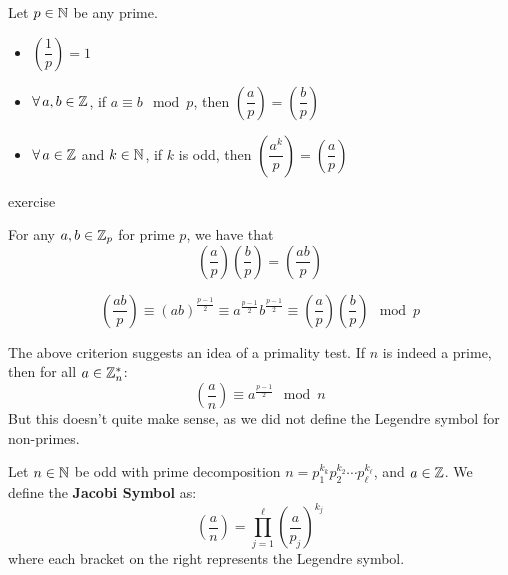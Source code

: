 \documentclass{article}
\begin{document}
\begin{thm}
    Let $ p \in \mathbb{N} $ be any prime.
    \begin{itemize}
        \item $ \left( \dfrac{1}{p} \right) = 1 $
        \item $ \forall \,  a, b \in \mathbb{Z} $, if $ a \equiv b \mod p $, then
            $ \left( \dfrac{a}{p} \right) = \left( \dfrac{b}{p} \right) $
        \item $ \forall \, a \in \mathbb{Z} $ and $ k \in \mathbb{N} $,
            if $ k $ is odd, then $ \left( \dfrac{a^{k}}{p} \right) = \left( \dfrac{a}{p} \right) $
    \end{itemize}
\end{thm}

\begin{pf}
    exercise
\end{pf}

\begin{thm}
    For any $ a, b \in \mathbb{Z}_{p} $ for prime $ p $, we have that
    \begin{equation*}
        \left( \frac{a}{p} \right) \left( \frac{b}{p} \right) = \left( \frac{ab}{p} \right)
    \end{equation*}
\end{thm}

\begin{pf}[source=Primary Source Material]
    \begin{equation*}
        \left( \frac{ab}{p} \right) \equiv (ab)^{\frac{p - 1}{2}}
        \equiv a^{\frac{p - 1}{2}} b^{\frac{p - 1}{2}}
        \equiv \left( \frac{a}{p} \right) \left( \frac{b}{p} \right) \mod p
    \end{equation*}
\end{pf}

The above criterion suggests an idea of a primality test.
If $ n $ is indeed a prime, then for all $ a \in \mathbb{Z}_{n}^{*} $:
\begin{equation*}
    \left( \frac{a}{n} \right) \equiv a^{\frac{p - 1}{2}} \mod n
\end{equation*}
But this doesn't quite make sense, as we did not define the Legendre symbol for non-primes.

\newpage
{}

\begin{defn}[title=Jacobi Symbol]
    Let $ n \in \mathbb{N} $ be odd with prime decomposition
    $ n = p_{1}^{k_{k}}p_{2}^{k_{2}}\cdots p_{\ell}^{k_{\ell}} $, and $ a \in \mathbb{Z} $. \vsp
    We define the \textbf{Jacobi Symbol} as:
    \begin{equation*}
        \left( \frac{a}{n} \right) = \prod_{j=1}^{\ell} \left( \frac{a}{p_{j}} \right)^{k_{j}}
    \end{equation*}
    where each bracket on the right represents the Legendre symbol.
\end{defn}
\end{document}
